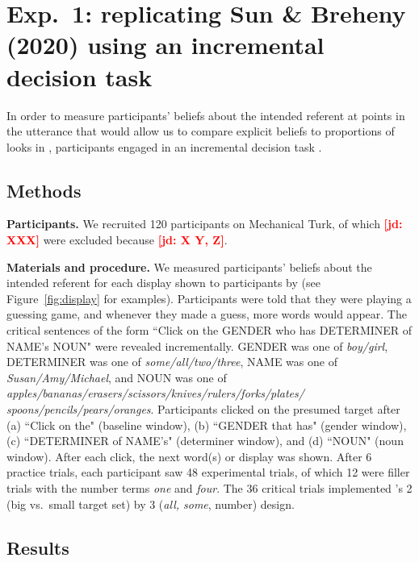 \documentclass[10pt,letterpaper]{article}
\newcommand{\figref}[1]{Figure~\ref{#1}}
\newcommand{\jd}[1]{\textcolor{Red}{\textbf{[jd: #1]}}}
\begin{document}
\section{Exp.~1: replicating Sun \& Breheny (2020) using an incremental decision task}

In order to measure participants' beliefs about the intended referent at points in the utterance that would allow us to compare explicit beliefs to proportions of looks in , participants engaged in an incremental decision task \cite{Allopenna1998,QingLD2018, KreissDegen2020,alsop2018}. 

\subsection{Methods}

\textbf{Participants.} We recruited 120 participants on Mechanical Turk, of which \jd{XXX} were excluded because \jd{X Y, Z}. 

\textbf{Materials and procedure.} We measured participants' beliefs about the intended referent for each display shown to participants by  (see \figref{fig:display} for examples). Participants were told that they were playing a guessing game, and whenever they made a guess, more words would appear. The critical sentences of the form ``Click on the GENDER who has DETERMINER  of NAME's NOUN" were revealed incrementally. GENDER was one of \emph{boy/girl}, DETERMINER was one of \emph{some/all/two/three}, NAME was one of \emph{Susan/Amy/Michael}, and NOUN was one of \emph{apples/bananas/erasers/scissors/knives/rulers/forks/plates/
spoons/pencils/pears/oranges}.  Participants clicked on the presumed target after (a) ``Click on the" (baseline window), (b) ``GENDER that has" (gender window), (c) ``DETERMINER of NAME's" (determiner window), and (d) ``NOUN" (noun window). After each click, the next word(s) or display was shown. After 6 practice trials, each participant saw 48 experimental trials, of which 12 were filler trials with the number terms \emph{one} and \emph{four}. The 36 critical trials implemented 's 2 (big vs.~small target set) by 3 (\emph{all, some}, number) design. 


\subsection{Results}

\end{document}
